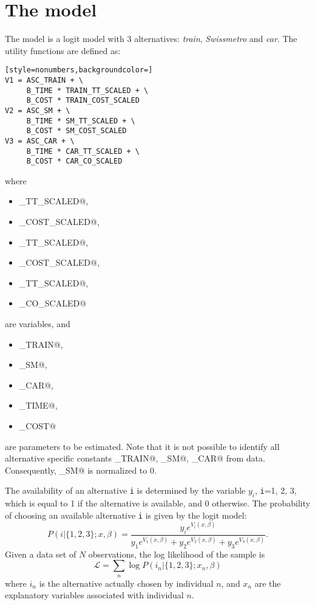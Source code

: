 \documentclass[12pt,a4paper]{article}
\renewcommand{\L}{\mathcal{L}}
\begin{document}
\section{The model}
The model is a logit model with 3 alternatives: \emph{train}, \emph{Swissmetro} and \emph{car}. The utility functions are defined as:
\begin{lstlisting}[style=nonumbers,backgroundcolor=]
V1 = ASC_TRAIN + \
     B_TIME * TRAIN_TT_SCALED + \
     B_COST * TRAIN_COST_SCALED
V2 = ASC_SM + \
     B_TIME * SM_TT_SCALED + \
     B_COST * SM_COST_SCALED
V3 = ASC_CAR + \
     B_TIME * CAR_TT_SCALED + \
     B_COST * CAR_CO_SCALED
\end{lstlisting}
where
\begin{itemize}
\item \lstinline@TRAIN_TT_SCALED@,
\item \lstinline@TRAIN_COST_SCALED@,
\item \lstinline@SM_TT_SCALED@,
\item \lstinline@SM_COST_SCALED@,
\item \lstinline@CAR_TT_SCALED@,
\item \lstinline@CAR_CO_SCALED@
\end{itemize}
are variables, and
\begin{itemize}
\item   \lstinline@ASC_TRAIN@,
\item   \lstinline@ASC_SM@,
\item   \lstinline@ASC_CAR@,
\item   \lstinline@B_TIME@,
\item   \lstinline@B_COST@
\end{itemize}
  are parameters to be estimated. Note that it is not possible to identify all alternative specific constants  
  \lstinline@ASC_TRAIN@,
  \lstinline@ASC_SM@,
  \lstinline@ASC_CAR@ from data. Consequently,  \lstinline@ASC_SM@
  is normalized to 0. 

The availability of an alternative \texttt{i} is determined by the
variable $y_i$, \texttt{i}=1, 2, 3, which is equal to 1 if the
alternative is available, and 0 otherwise. The probability of choosing an
available alternative \texttt{i} is given by the logit model: 
\begin{equation}
P(i|\{1,2,3\};x,\beta) = \frac{y_i e^{V_i(x,\beta)}}{y_1 e^{V_1(x,\beta)} + y_2 e^{V_2(x,\beta)}+ y_3 e^{V_3(x,\beta)}}.
\end{equation}
Given a data set of $N$ observations, the log likelihood of the
sample is 
\begin{equation}
\L = \sum_n \log P(i_n|\{1,2,3\};x_n,\beta)
\end{equation}
where $i_n$ is the alternative actually chosen
by individual $n$, and $x_n$ are the explanatory variables associated with
individual $n$.  
\end{document}
